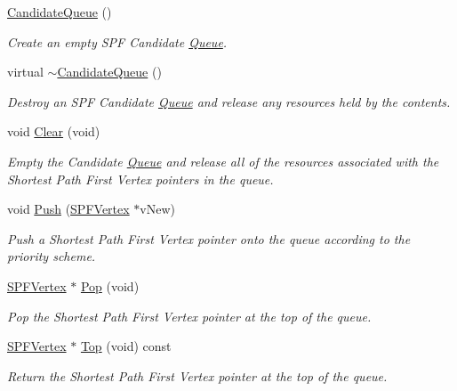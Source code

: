 \begin{DoxyCompactItemize}
\item 
\hyperlink{classns3_1_1CandidateQueue_af4e4b6db2343b6fc3281ff7c472e102e}{Candidate\+Queue} ()
\begin{DoxyCompactList}\small\item\em Create an empty S\+PF Candidate \hyperlink{classns3_1_1Queue}{Queue}. \end{DoxyCompactList}\item 
virtual \hyperlink{classns3_1_1CandidateQueue_a8fb11f89dab8a2c5006f48756804b052}{$\sim$\+Candidate\+Queue} ()
\begin{DoxyCompactList}\small\item\em Destroy an S\+PF Candidate \hyperlink{classns3_1_1Queue}{Queue} and release any resources held by the contents. \end{DoxyCompactList}\item 
void \hyperlink{classns3_1_1CandidateQueue_a2c661625c97b0251e9013bd61435cc01}{Clear} (void)
\begin{DoxyCompactList}\small\item\em Empty the Candidate \hyperlink{classns3_1_1Queue}{Queue} and release all of the resources associated with the Shortest Path First Vertex pointers in the queue. \end{DoxyCompactList}\item 
void \hyperlink{classns3_1_1CandidateQueue_a52f6bdb3651569f349f5e522ccc4d88f}{Push} (\hyperlink{classns3_1_1SPFVertex}{S\+P\+F\+Vertex} $\ast$v\+New)
\begin{DoxyCompactList}\small\item\em Push a Shortest Path First Vertex pointer onto the queue according to the priority scheme. \end{DoxyCompactList}\item 
\hyperlink{classns3_1_1SPFVertex}{S\+P\+F\+Vertex} $\ast$ \hyperlink{classns3_1_1CandidateQueue_a7a9b3855349e02e76cd6f67a556a2ac9}{Pop} (void)
\begin{DoxyCompactList}\small\item\em Pop the Shortest Path First Vertex pointer at the top of the queue. \end{DoxyCompactList}\item 
\hyperlink{classns3_1_1SPFVertex}{S\+P\+F\+Vertex} $\ast$ \hyperlink{classns3_1_1CandidateQueue_aab3a22d3a36bb8414f4c95cd5dc9a0f8}{Top} (void) const 
\begin{DoxyCompactList}\small\item\em Return the Shortest Path First Vertex pointer at the top of the queue. \end{DoxyCompactList}\item 

\end{DoxyCompactItemize}
